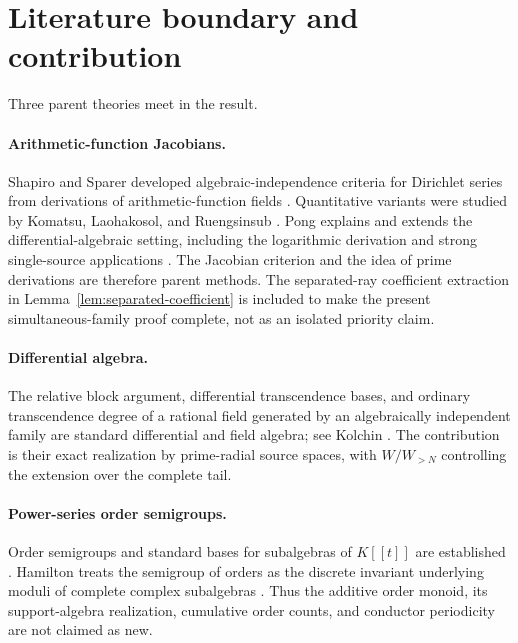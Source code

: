 \documentclass[11pt]{article}
\theoremstyle{definition}
\theoremstyle{remark}
\begin{document}
\section{Literature boundary and contribution}\label{sec:literature}

Three parent theories meet in the result.

\paragraph{Arithmetic-function Jacobians.}
Shapiro and Sparer developed algebraic-independence criteria for Dirichlet series from derivations
of arithmetic-function fields \cite{ShapiroSparer1986}.  Quantitative variants were studied by
Komatsu, Laohakosol, and Ruengsinsub \cite{KomatsuLaohakosolRuengsinsub2011}.  Pong explains and
extends the differential-algebraic setting, including the logarithmic derivation and strong
single-source applications \cite{Pong2016}.  The Jacobian criterion and the idea of prime
derivations are therefore parent methods.  The separated-ray coefficient extraction in
Lemma~\ref{lem:separated-coefficient} is included to make the present simultaneous-family proof
complete, not as an isolated priority claim.

\paragraph{Differential algebra.}
The relative block argument, differential transcendence bases, and ordinary transcendence degree
of a rational field generated by an algebraically independent family are standard differential
and field algebra; see Kolchin \cite{Kolchin1973}.  The contribution is their exact realization
by prime-radial source spaces, with $W/W_{>N}$ controlling the extension over the complete tail.

\paragraph{Power-series order semigroups.}
Order semigroups and standard bases for subalgebras of $K[[t]]$ are established
\cite{AssiGarciaSanchezMicale2017}.  Hamilton treats the semigroup of orders as the discrete
invariant underlying moduli of complete complex subalgebras \cite{Hamilton2020}.  Thus the
additive order monoid, its support-algebra realization, cumulative order counts, and conductor
periodicity are not claimed as new.
\end{document}
